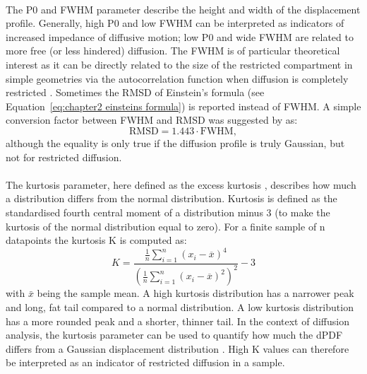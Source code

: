 \paragraph{}
The P0 and FWHM parameter describe the height and width of the displacement profile. Generally, high P0 and low FWHM can be interpreted as indicators of increased impedance of diffusive motion; low P0 and wide FWHM are related to more free (or less hindered) diffusion. The FWHM is of particular theoretical interest as it can be directly related to the size of the restricted compartment in simple geometries via the autocorrelation function when diffusion is completely restricted \citep{Cory:1990,Kuchel:1997}. Sometimes the \gls{RMSD} of Einstein's formula (see Equation~\ref{eq:chapter2 einsteins formula}) is reported instead of FWHM. A simple conversion factor between FWHM and RMSD was suggested by \citet{Cory:1990} as:
\begin{equation}
	\mbox{RMSD} = 1.443 \cdot \mbox{FWHM},
\end{equation}
although the equality is only true if the diffusion profile is truly Gaussian, but not for restricted diffusion.
\paragraph{}
The kurtosis parameter, here defined as the excess kurtosis \citep{Kenney:1957}, describes how much a distribution differs from the normal distribution. Kurtosis is defined as the standardised fourth central moment of a distribution minus 3 (to make the kurtosis of the normal distribution equal to zero). For a finite sample of n datapoints the kurtosis K is computed as:
\begin{equation}
	K=\frac{\tfrac{1}{n} \sum_{i=1}^n (x_i - \overline{x})^4}{\left(\tfrac{1}{n} \sum_{i=1}^n (x_i - \overline{x})^2\right)^2} - 3 
\end{equation}
with $\bar{x}$ being the sample mean. A high kurtosis distribution has a narrower peak and long, fat tail compared to a normal distribution. A low kurtosis distribution has a more rounded peak and a shorter, thinner tail. In the context of diffusion analysis, the kurtosis parameter can be used to quantify how much the \gls{dPDF} differs from a Gaussian displacement distribution \citep{Jensen:2010}. High K values can therefore be interpreted as an indicator of restricted diffusion in a sample.

